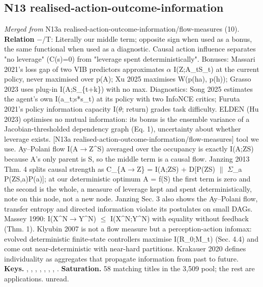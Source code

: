 \documentclass[10pt]{article}
\begin{document}
\subsection{N13 realised-action-outcome-information}\label{node:S3-N13-realised-action-outcome-information}
\textit{Merged from} N13a realised-action-outcome-information/flow-measures (10). \textbf{Relation} $-$/\textsf{T}: Literally our middle term; opposite sign when used as a bonus, the same functional when used as a diagnostic. Causal action influence separates "no leverage" (C(s)=0) from "leverage spent deterministically". Bonuses: Massari 2021's loss gap of two VIB predictors approximates \ensuremath{\alpha} I(Z;A\_t\textbar{}S\_t) at the current policy, never maximised over p(A); Xu 2025 maximises W(p(h\textbar{}a), p(h)); Grasso 2023 uses plug-in I(A;S\_\{t+k\}) with no max. Diagnostics: Song 2025 estimates the agent's own I(a\_t;s*\textbar{}s\_t) at its policy with two InfoNCE critics; Furuta 2021's policy information capacity I(\ensuremath{\theta}; return) grades task difficulty. ELDEN (Hu 2023) optimises no mutual information: its bonus is the ensemble variance of a Jacobian-thresholded dependency graph (Eq. 1), uncertainty about whether leverage exists. [N13a realised-action-outcome-information/flow-measures] tool we use. Ay--Polani flow I(A\ensuremath{\to}Z\textbar{}\^{}S) averaged over the occupancy is exactly I(A;Z\textbar{}S) because A's only parent is S, so the middle term is a causal flow. Janzing 2013 Thm. 4 splits causal strength as C\_\{A\ensuremath{\to}Z\} = I(A;Z\textbar{}S) + D[P(Z\textbar{}S) \ensuremath{\|} \ensuremath{\Sigma}\_a P(Z\textbar{}S,a)P(a)]; at our deterministic optimum A = f(S) the first term is zero and the second is the whole, a measure of leverage kept and spent deterministically, note on this node, not a new node. Janzing Sec. 3 also shows the Ay--Polani flow, transfer entropy and directed information violate its postulates on small DAGs. Massey 1990: I(X\^{}N\ensuremath{\to}Y\^{}N) \ensuremath{\leq} I(X\^{}N;Y\^{}N) with equality without feedback (Thm. 1). Klyubin 2007 is not a flow measure but a perception-action infomax: evolved deterministic finite-state controllers maximise I(R\_0;M\_t) (Sec. 4.4) and come out near-deterministic with near-hard partitions. Krakauer 2020 defines individuality as aggregates that propagate information from past to future. \textbf{Keys.} \citet{Ay-information08}, \citet{Janzing-quantifying13}, \citet{Massey-causality90}, \citet{Schreiber-measuring00}, \citet{Touchette-information00}, \citet{Klyubin-organization04}, \citet{Klyubin-representations07}, \citet{Krakauer-information20}. \textbf{Saturation.} 58 matching titles in the 3,509 pool; the rest are applications. \citet{Bertschinger-autonomy08} unread.
\end{document}
